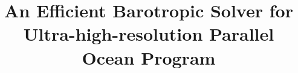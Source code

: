 \documentclass{sig-alternate}
\begin{document}
%

\title{An Efficient Barotropic Solver for Ultra-high-resolution Parallel Ocean Program}
%
%
%
%
%
\end{document}
